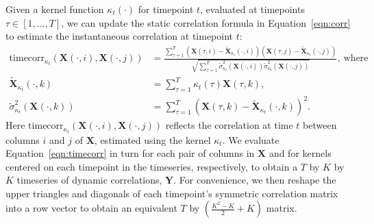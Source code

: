 \documentclass[english]{article}
\begin{document}
Given a kernel function $\kappa_t(\cdot)$ for timepoint $t$,
evaluated at timepoints $\tau \in \left[ 1, ..., T \right]$, we
can update the static correlation formula in Equation~\ref{eqn:corr}
to estimate the instantaneous correlation at timepoint $t$:
\begin{align}
  \mathrm{timecorr}_{\kappa_t}\left(\mathbf{X}(\cdot, i), \mathbf{X}(\cdot, j)\right) &= \frac{\sum_{\tau=1}^T \left( \mathbf{X}(\tau, i) -
                                       \widetilde{\mathbf{X}}_{\kappa_t}(\cdot,
                                                                                        i) \right)
                                 \left( \mathbf{X}(\tau, j) -
                                        \widetilde{\mathbf{X}}_{\kappa_t}(\cdot,
                                                                                        j)\right)}
              {\sqrt{\sum_{\tau=1}^T
                                              \widetilde{\sigma}_{\kappa_t}^2(\mathbf{X}(\cdot,
                                                                                        i))
                                              \widetilde{\sigma}_{\kappa_t}^2(\mathbf{X}(\cdot, j))}},~\mathrm{where}\label{eqn:timecorr}\\
  \widetilde{\mathbf{X}}_{\kappa_t}(\cdot, k) &= \sum_{\tau=1}^T
                       \kappa_t(\tau)\mathbf{X}(\tau, k),\\
  \widetilde{\sigma}_{\kappa_t}^2(\mathbf{X}(\cdot, k)) &= \sum_{\tau=1}^T
                                                  \left(
                                                  \mathbf{X}(\tau, k) -
                            \widetilde{\mathbf{X}}_{\kappa_t}(\cdot, k) \right)^2.
\end{align}
Here
$\mathrm{timecorr}_{\kappa_t}(\mathbf{X}(\cdot, i), \mathbf{X}(\cdot,
j))$ reflects the correlation at time $t$ between columns $i$ and $j$
of $\mathbf{X}$, estimated using the kernel $\kappa_t$.  We evaluate
Equation~\ref{eqn:timecorr} in turn for each pair of columns in
$\mathbf{X}$ and for kernels centered on each timepoint in the
timeseries, respectively, to obtain a $T$ by $K$ by $K$ timeseries of
dynamic correlations, $\mathbf{Y}$.  For convenience, we then reshape
the upper triangles and diagonals of each timepoint's symmetric correlation matrix into a row
vector to obtain an equivalent $T$ by $\left( \frac{K^2 - K}{2} + K \right)$ matrix.
\end{document}
